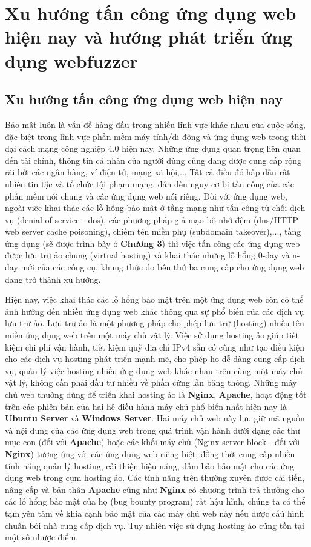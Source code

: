 \chapter{Xu hướng tấn công ứng dụng web hiện nay và hướng phát triển ứng dụng webfuzzer}
\section{Xu hướng tấn công ứng dụng web hiện nay}
Bảo mật luôn là vấn đề hàng đầu trong nhiều lĩnh vực khác nhau của cuộc sống, đặc biệt trong lĩnh vực phần mềm máy tính/di động và ứng dụng web trong thời đại cách mạng công nghiệp 4.0 hiện nay. Những ứng dụng quan trọng liên quan đến tài chính, thông tin cá nhân của người dùng cũng đang được cung cấp rộng rãi bởi các ngân hàng, ví điện tử, mạng xã hội,... Tất cả điều đó hấp dẫn rất nhiều tin tặc và tổ chức tội phạm mạng, dẫn đến nguy cơ bị tấn công của các phần mềm nói chung và các ứng dụng web nói riêng. Đối với ứng dụng web, ngoài việc khai thác các lỗ hổng bảo mật ở tầng mạng như tấn công từ chối dịch vụ (denial of service - \acrshort{dos}), các phương pháp giả mạo bộ nhớ đệm (\acrshort{dns}/HTTP web server cache poisoning), chiếm tên miền phụ (subdomain takeover),..., tầng ứng dụng (sẽ được trình bày ở \textbf{Chương 3}) thì việc tấn công các ứng dụng web được lưu trữ ảo chung (virtual hosting) và khai thác những lỗ hổng 0-day và n-day mới của các công cụ, khung thức do bên thứ ba cung cấp cho ứng dụng web đang trở thành xu hướng. \par
Hiện nay, việc khai thác các lỗ hổng bảo mật trên một ứng dụng web còn có thể ảnh hưởng đến nhiều ứng dụng web khác thông qua sự phổ biến của các dịch vụ lưu trữ ảo. Lưu trữ ảo là một phương pháp cho phép lưu trữ (hosting) nhiều tên miền ứng dụng web trên một máy chủ vật lý. Việc sử dụng hosting ảo giúp tiết kiệm chi phí vận hành, tiết kiệm quỹ địa chỉ IPv4 sẵn có cũng như tạo điều kiện cho các dịch vụ hosting phát triển mạnh mẽ, cho phép họ dễ dàng cung cấp dịch vụ, quản lý việc hosting nhiều ứng dụng web khác nhau trên cùng một máy chủ vật lý, không cần phải đầu tư nhiều về phần cứng lẫn băng thông. Những máy chủ web thường dùng để triển khai hosting ảo là \textbf{Nginx}, \textbf{Apache}, hoạt động tốt trên các phiên bản của hai hệ điều hành máy chủ phổ biến nhất hiện nay là \textbf{Ubuntu Server} và \textbf{Windows Server}. Hai máy chủ web này lưu giữ mã nguồn và nội dung của các ứng dụng web trong quá trình vận hành dưới dạng các thư mục con (đối với \textbf{Apache}) hoặc các khối máy chủ (Nginx server block - đối với \textbf{Nginx}) tương ứng với các ứng dụng web riêng biệt, đồng thời cung cấp nhiều tính năng quản lý hosting, cải thiện hiệu năng, đảm bảo bảo mật cho các ứng dụng web trong cụm hosting ảo. Các tính năng trên thường xuyên được cải tiến, nâng cấp và bản thân \textbf{Apache} cũng như \textbf{Nginx} có chương trình trả thưởng cho các lỗ hổng bảo mật của họ (bug bounty program) rất hậu hĩnh, chúng ta có thể tạm yên tâm về khía cạnh bảo mật của các máy chủ web này nếu được cấú hình chuẩn bởi nhà cung cấp dịch vụ. Tuy nhiên việc sử dụng hosting ảo cũng tồn tại một số nhược điểm.
